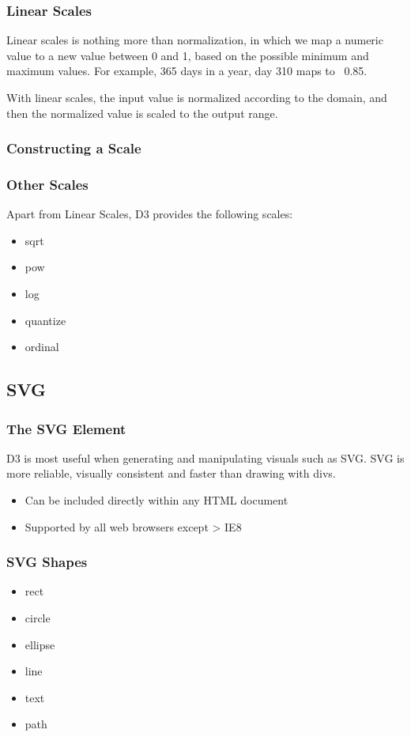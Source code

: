 \documentclass[red]{beamer}
\begin{document}
\begin{frame}
  \frametitle{Linear Scales}
  Linear scales is nothing more than normalization, in which we map a numeric value to a 
  new value between 0 and 1, based on the possible minimum and maximum values. For example, 
  365 days in a year, day 310 maps to ~0.85. 
  \newline

  With linear scales, the input value is normalized according to the domain, and then the 
  normalized value is scaled to the output range. 
\end{frame}

\begin{frame}
  \frametitle{Constructing a Scale}
  \lstll
\end{frame}

\begin{frame}
  \frametitle{Other Scales}
  Apart from Linear Scales, D3 provides the following scales:
  \begin{itemize}
  \item<1->sqrt
  \item<2->pow
  \item<3->log
  \item<4->quantize
  \item<5->ordinal
  \end{itemize}
\end{frame}

\subsection{SVG}

\begin{frame}
    \frametitle{The SVG Element}
    D3 is most useful when generating and manipulating visuals such as SVG. SVG is more reliable, visually consistent and faster than drawing with divs. 
    \newline
    \begin{itemize}
    \item<1-> Can be included directly within any HTML document
    \item<2-> Supported by all web browsers except > IE8
    \end{itemize}
\end{frame}

\begin{frame}
  \frametitle{SVG Shapes}
  \begin{itemize}
    \item<1 -> rect
    \item<2 -> circle
    \item<3 -> ellipse
    \item<4 -> line
    \item<5 -> text
    \item<6 -> path
  \end{itemize}
\end{frame}
\end{document}
